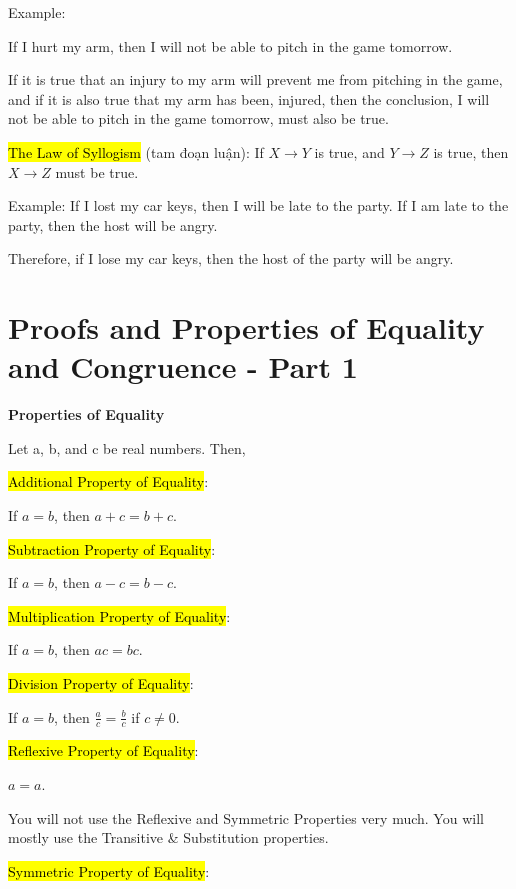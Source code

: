 Example:

If I hurt my arm, then I will not be able to pitch in the game tomorrow.

If it is true that an injury to my arm will prevent me from pitching in the game, and if it is also true that my arm has been, injured, then the conclusion, I will not be able to pitch in the game tomorrow, must also be true.

\vspace{.5cm}

\hl{The Law of Syllogism} (tam đoạn luận): If $X \rightarrow Y$ is true, and $Y \rightarrow Z$ is true, then $X \rightarrow Z$ must be true.

Example: If I lost my car keys, then I will be late to the party. If I am late to the party, then the host will be angry.

Therefore, if I lose my car keys, then the host of the party will be angry.

\section{Proofs and Properties of Equality and Congruence - Part 1}

\vspace{0.3 cm}

\centerline{\textbf{\LARGE Properties of Equality}}

\vspace{0.5cm}

Let a, b, and c be real numbers. Then,

\hl{Additional Property of Equality}:

If $a=b$, then $a+c=b+c$.

\hl{Subtraction Property of Equality}:

If $a=b$, then $a-c=b-c$.

\hl{Multiplication Property of Equality}:

If $a=b$, then $ac=bc$.

\hl{Division Property of Equality}:

If $a=b$, then $\frac{a}{c}=\frac{b}{c}$ if $c\neq 0$.

\hl{Reflexive Property of Equality}:

$a=a$.

You will not use the Reflexive and Symmetric Properties very much. You will mostly use the Transitive \& Substitution properties.

\hl{Symmetric Property of Equality}:

